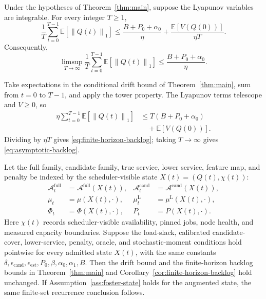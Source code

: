 \documentclass[opre,dblanonrev]{informs4}
\newcommand{\Afull}{\mathcal A^{\mathrm{full}}}
\newcommand{\Acand}{\mathcal A^{\mathrm{cand}}}
\newcommand{\E}{\mathbb E}
\newcommand{\lowermu}{\mu^{\mathrm L}}
\newcommand{\normone}[1]{\left\|#1\right\|_1}
\begin{document}
\begin{corollary}
\label{cor:finite-horizon-backlog}
Under the hypotheses of Theorem~\ref{thm:main}, suppose the Lyapunov variables
are integrable.  For every integer \(T\ge1\),
\begin{equation}
  \frac1T\sum_{t=0}^{T-1}
  \E\!\left[\normone{Q(t)}\right]
  \le
  \frac{B+P_0+\alpha_0}{\eta}
  +\frac{\E[V(Q(0))]}{\eta T}.
  \label{eq:finite-horizon-backlog}
\end{equation}
Consequently,
\begin{equation}
  \limsup_{T\to\infty}
  \frac1T\sum_{t=0}^{T-1}
  \E\!\left[\normone{Q(t)}\right]
  \le
  \frac{B+P_0+\alpha_0}{\eta}.
  \label{eq:asymptotic-backlog}
\end{equation}
\end{corollary}

Take expectations in the conditional drift bound of
Theorem~\ref{thm:main}, sum from \(t=0\) to \(T-1\), and apply the tower
property.  The Lyapunov terms telescope and \(V\ge0\), so
\begin{equation}
  \begin{aligned}
  \eta\sum_{t=0}^{T-1}\E[\normone{Q(t)}]
  &\le T(B+P_0+\alpha_0)\\
  &\quad{}+\E[V(Q(0))].
  \end{aligned}
\end{equation}
Dividing by \(\eta T\) gives
\eqref{eq:finite-horizon-backlog}; taking \(T\to\infty\) gives
\eqref{eq:asymptotic-backlog}.
\endproof

\begin{corollary}
\label{cor:statewise}
Let the full family, candidate family, true service, lower service, feature map,
and penalty be indexed by the scheduler-visible state
\(X(t)=(Q(t),\chi(t))\):
\begin{equation}
  \begin{aligned}
  \Afull_t&=\Afull(X(t)),
  &\Acand_t&=\Acand(X(t)),\\
  \mu_t&=\mu(X(t),\cdot),
  &\lowermu_t&=\lowermu(X(t),\cdot),\\
  \Phi_t&=\Phi(X(t),\cdot),
  &P_t&=P(X(t),\cdot).
  \end{aligned}
  \label{eq:statewise-objects}
\end{equation}
Here \(\chi(t)\) records scheduler-visible availability, pinned jobs, node
health, and measured capacity boundaries.  Suppose the load-slack, calibrated
candidate-cover, lower-service, penalty, oracle, and stochastic-moment
conditions hold pointwise for every admitted state \(X(t)\), with the same
constants
\(\delta,\epsilon_{\mathrm{cand}},\epsilon_{\mathrm{est}},P_0,\beta,\alpha_0,
\alpha_1,B\).  Then the drift bound and the finite-horizon backlog bounds in
Theorem~\ref{thm:main} and Corollary~\ref{cor:finite-horizon-backlog} hold
unchanged.  If Assumption~\ref{ass:foster-state} holds for the augmented state,
the same finite-set recurrence conclusion follows.
\end{corollary}
\end{document}
